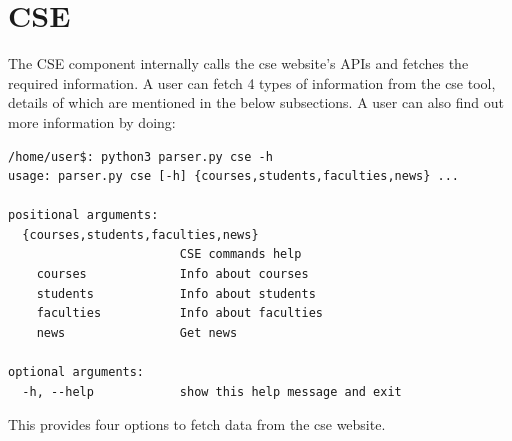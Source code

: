 \documentclass[12pt, letterpaper, twoside]{article}
\begin{document}
\section{CSE}
The CSE component internally calls the cse website's APIs and fetches the required information. 
A user can fetch 4 types of information from the cse tool, details of which are mentioned in the below subsections.
A user can also find out more information by doing:
\begin{verbatim}
/home/user$: python3 parser.py cse -h
usage: parser.py cse [-h] {courses,students,faculties,news} ...

positional arguments:
  {courses,students,faculties,news}
                        CSE commands help
    courses             Info about courses
    students            Info about students
    faculties           Info about faculties
    news                Get news

optional arguments:
  -h, --help            show this help message and exit    
\end{verbatim}
This provides four options to fetch data from the cse website.
\end{document}
